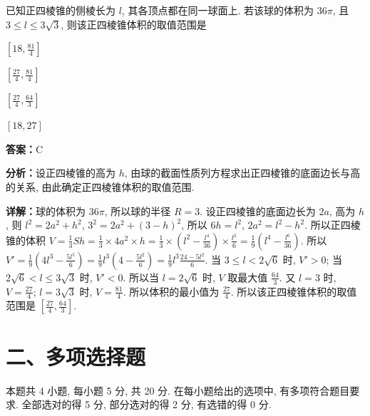 \begin{question}[points=5]
已知正四棱锥的侧棱长为 $l$, 其各顶点都在同一球面上. 若该球的体积为 $36\pi$, 且 $3 \le l \le 3\sqrt{3}$, 则该正四棱锥体积的取值范围是
\begin{choices}
  \item $\left[18, \frac{81}{4}\right]$
  \item $\left[\frac{27}{4}, \frac{81}{4}\right]$
  \item $\left[\frac{27}{4}, \frac{64}{3}\right]$
  \item $[18, 27]$
\end{choices}
\begin{solution}
\textbf{答案：}C

\textbf{分析：}设正四棱锥的高为 $h$, 由球的截面性质列方程求出正四棱锥的底面边长与高的关系, 由此确定正四棱锥体积的取值范围.

\textbf{详解：}球的体积为 $36\pi$, 所以球的半径 $R=3$. 设正四棱锥的底面边长为 $2a$, 高为 $h$, 则 $l^2 = 2a^2 + h^2$, $3^2 = 2a^2 + (3-h)^2$, 所以 $6h = l^2$, $2a^2 = l^2 - h^2$. 所以正四棱锥的体积 $V = \frac{1}{3}Sh = \frac{1}{3} \times 4a^2 \times h = \frac{1}{3} \times (l^2 - \frac{l^4}{36}) \times \frac{l^2}{6} = \frac{1}{9}\left(l^4 - \frac{l^6}{36}\right)$. 所以 $V' = \frac{1}{9}\left(4l^3 - \frac{5l^5}{6}\right) = \frac{1}{9}l^3\left(4 - \frac{5l^2}{6}\right) = \frac{1}{9}l^3\frac{24 - 5l^2}{6}$. 当 $3 \le l < 2\sqrt{6}$ 时, $V' > 0$; 当 $2\sqrt{6} < l \le 3\sqrt{3}$ 时, $V' < 0$. 所以当 $l = 2\sqrt{6}$ 时, $V$ 取最大值 $\frac{64}{3}$. 又 $l=3$ 时, $V = \frac{27}{4}$; $l=3\sqrt{3}$ 时, $V = \frac{81}{4}$. 所以体积的最小值为 $\frac{27}{4}$. 所以该正四棱锥体积的取值范围是 $\left[\frac{27}{4}, \frac{64}{3}\right]$.
\end{solution}
\end{question}

\section*{二、多项选择题}
本题共 4 小题, 每小题 5 分, 共 20 分. 在每小题给出的选项中, 有多项符合题目要求. 全部选对的得 5 分, 部分选对的得 2 分, 有选错的得 0 分.

